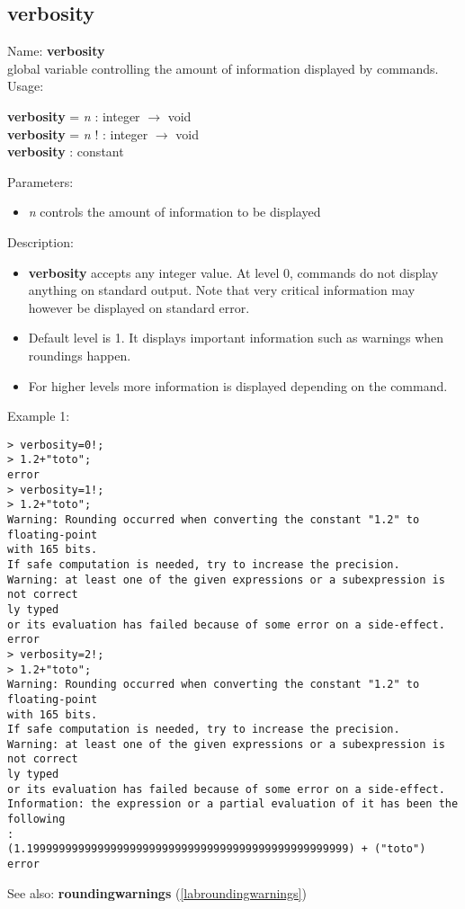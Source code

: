 \subsection{verbosity}
\label{labverbosity}
\noindent Name: \textbf{verbosity}\\
global variable controlling the amount of information displayed by commands.\\
\noindent Usage: 
\begin{center}
\textbf{verbosity} = \emph{n} : \textsf{integer} $\rightarrow$ \textsf{void}\\
\textbf{verbosity} = \emph{n} ! : \textsf{integer} $\rightarrow$ \textsf{void}\\
\textbf{verbosity} : \textsf{constant}\\
\end{center}
Parameters: 
\begin{itemize}
\item \emph{n} controls the amount of information to be displayed
\end{itemize}
\noindent Description: \begin{itemize}

\item \textbf{verbosity} accepts any integer value. At level 0, commands do not display anything
   on standard output. Note that very critical information may however be displayed on
   standard error.

\item Default level is 1. It displays important information such as warnings when 
   roundings happen.

\item For higher levels more information is displayed depending on the command.
\end{itemize}
\noindent Example 1: 
\begin{center}\begin{minipage}{15cm}\begin{Verbatim}[frame=single]
> verbosity=0!;
> 1.2+"toto";
error
> verbosity=1!;
> 1.2+"toto";
Warning: Rounding occurred when converting the constant "1.2" to floating-point 
with 165 bits.
If safe computation is needed, try to increase the precision.
Warning: at least one of the given expressions or a subexpression is not correct
ly typed
or its evaluation has failed because of some error on a side-effect.
error
> verbosity=2!;
> 1.2+"toto";
Warning: Rounding occurred when converting the constant "1.2" to floating-point 
with 165 bits.
If safe computation is needed, try to increase the precision.
Warning: at least one of the given expressions or a subexpression is not correct
ly typed
or its evaluation has failed because of some error on a side-effect.
Information: the expression or a partial evaluation of it has been the following
:
(1.19999999999999999999999999999999999999999999999999) + ("toto")
error
\end{Verbatim}
\end{minipage}\end{center}
See also: \textbf{roundingwarnings} (\ref{labroundingwarnings})
